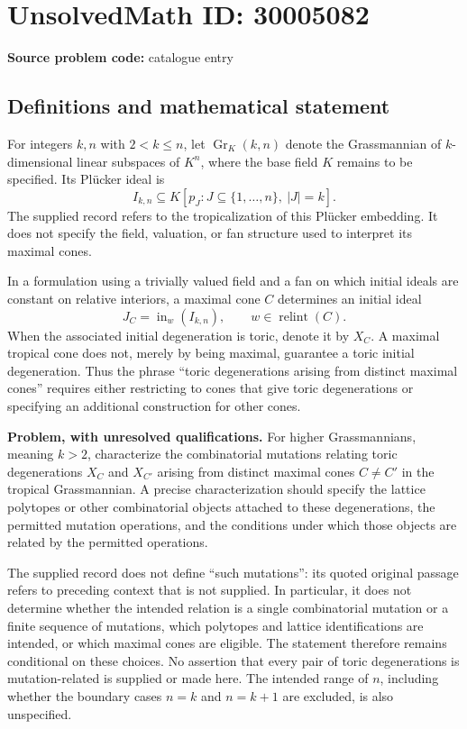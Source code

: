 \documentclass[11pt]{article}
\begin{document}
\section*{UnsolvedMath ID: 30005082}
\textbf{Source problem code:} catalogue entry
\subsection{Definitions and mathematical statement}
For integers \(k,n\) with \(2<k\leq n\), let \(\operatorname{Gr}_K(k,n)\) denote the Grassmannian of \(k\)-dimensional linear subspaces of \(K^n\), where the base field \(K\) remains to be specified. Its Pl\"ucker ideal is
\[
I_{k,n}\subseteq K[p_J: J\subseteq\{1,\ldots,n\},\ |J|=k].
\]
The supplied record refers to the tropicalization of this Pl\"ucker embedding. It does not specify the field, valuation, or fan structure used to interpret its maximal cones.

In a formulation using a trivially valued field and a fan on which initial ideals are constant on relative interiors, a maximal cone \(C\) determines an initial ideal
\[
J_C=\operatorname{in}_{w}(I_{k,n}),\qquad w\in\operatorname{relint}(C).
\]
When the associated initial degeneration is toric, denote it by \(X_C\). A maximal tropical cone does not, merely by being maximal, guarantee a toric initial degeneration. Thus the phrase ``toric degenerations arising from distinct maximal cones'' requires either restricting to cones that give toric degenerations or specifying an additional construction for other cones.

\textbf{Problem, with unresolved qualifications.} For higher Grassmannians, meaning \(k>2\), characterize the combinatorial mutations relating toric degenerations \(X_C\) and \(X_{C'}\) arising from distinct maximal cones \(C\neq C'\) in the tropical Grassmannian. A precise characterization should specify the lattice polytopes or other combinatorial objects attached to these degenerations, the permitted mutation operations, and the conditions under which those objects are related by the permitted operations.

The supplied record does not define ``such mutations'': its quoted original passage refers to preceding context that is not supplied. In particular, it does not determine whether the intended relation is a single combinatorial mutation or a finite sequence of mutations, which polytopes and lattice identifications are intended, or which maximal cones are eligible. The statement therefore remains conditional on these choices. No assertion that every pair of toric degenerations is mutation-related is supplied or made here. The intended range of \(n\), including whether the boundary cases \(n=k\) and \(n=k+1\) are excluded, is also unspecified.
\end{document}
